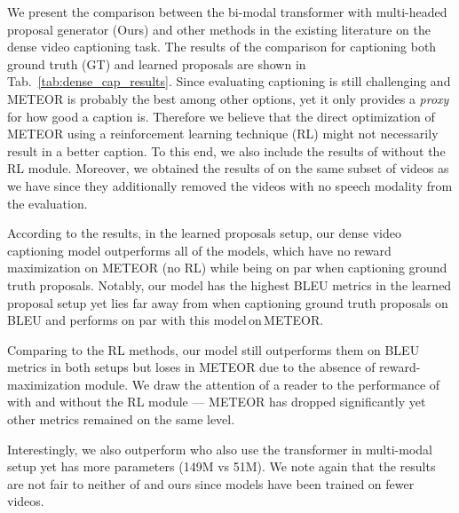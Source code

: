 \documentclass{src/bmvc2k}
\begin{document}
We present the comparison between the bi-modal transformer with multi-headed proposal generator (Ours) and other methods in the existing literature \cite{Krishna2017,Li2018,masked_transformer_Zhou2018,bafcg_Wang2018n,MFT_Xiong2018,Streamlined_Mun2019,mdvc_Iashin_2020,Rahman2019} on the dense video captioning task. The results of the comparison for captioning both ground truth (GT) and learned proposals are shown in Tab.~\ref{tab:dense_cap_results}. Since evaluating captioning is still challenging and METEOR is probably the best among other options, yet it only provides a \textit{proxy} for how good a caption is. Therefore we believe that the direct optimization of METEOR using a reinforcement learning technique (RL) might not necessarily result in a better caption. To this end, we also include the results of \cite{Li2018,Streamlined_Mun2019} without the RL module. Moreover, we obtained the results of \cite{mdvc_Iashin_2020} on the same subset of videos as we have since they additionally removed the videos with no speech modality from the evaluation.

According to the results, in the learned proposals setup, our dense video captioning model outperforms all of the models, which have no reward maximization on METEOR (no RL) while being on par when captioning ground truth proposals. Notably, our model has the highest BLEU metrics in the learned proposal setup yet lies far away from \cite{masked_transformer_Zhou2018} when captioning ground truth proposals on BLEU and performs on par with this model\,on\,METEOR.

Comparing to the RL methods, our model still outperforms them on BLEU metrics in both setups but loses in METEOR due to the absence of reward-maximization module. We draw the attention of a reader to the performance of \cite{Li2018} with and without the RL module --- METEOR has dropped significantly yet other metrics remained on the same level.

Interestingly, we also outperform \cite{mdvc_Iashin_2020} who also use the transformer in multi-modal setup yet has more parameters (149M vs 51M). We note again that the results are not fair to neither of \cite{Rahman2019,mdvc_Iashin_2020} and ours since models have been trained on fewer videos.
\end{document}
